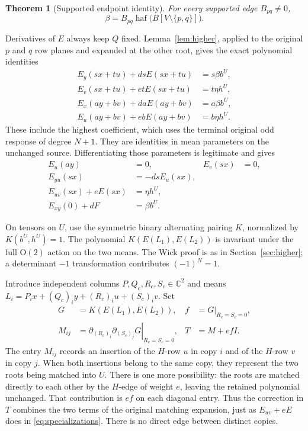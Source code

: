 \documentclass[11pt]{article}
\newtheorem{theorem}{Theorem}[section]
\theoremstyle{definition}
\theoremstyle{plain}
\numberwithin{equation}{section}
\begin{document}
\begin{theorem}[Supported endpoint identity]\label{thm:endpoint}
For every supported edge \(B_{pq}\ne0\),
\[
 \beta=B_{pq}\operatorname{haf}\bigl(B[V\setminus\{p,q\}]\bigr).
\]
\end{theorem}

Derivatives of \(E\) always keep \(Q\) fixed. Lemma~\ref{lem:higher}, applied
to the original \(p\) and \(q\) row planes and expanded at the other root,
gives the exact polynomial identities
\begin{equation}
 \begin{aligned}
 E_y(sx+tu)+dsE(sx+tu)&=s\beta b^U,\\
 E_v(sx+tu)+etE(sx+tu)&=t\eta h^U,\\
 E_x(ay+bv)+daE(ay+bv)&=a\beta b^U,\\
 E_u(ay+bv)+ebE(ay+bv)&=b\eta h^U.
 \end{aligned}
 \tag{7}\label{eq:boundary}
\end{equation}
These include the highest coefficient, which uses the terminal original odd
response of degree \(N+1\). They are identities in mean parameters on the
unchanged source. Differentiating those parameters is legitimate and gives
\begin{equation}
 \begin{aligned}
 E_u(ay)&=0,&E_v(sx)&=0,\\
 E_{yu}(sx)&=-dsE_u(sx),\\
 E_{uv}(sx)+eE(sx)&=\eta h^U,\\
 E_{xy}(0)+dF&=\beta b^U.
 \end{aligned}
 \tag{8}\label{eq:specializations}
\end{equation}

On tensors on \(U\), use the symmetric binary alternating pairing \(K\),
normalized by \(K(b^U,h^U)=1\). The polynomial
\(K(E(L_1),E(L_2))\) is invariant under the full \(\mathrm O(2)\) action
on the two means. The Wick proof is as in Section~\ref{sec:higher}; a
determinant \(-1\) transformation contributes \((-1)^N=1\).

Introduce independent columns \(P,Q_c,R_c,S_c\in\mathbb C^2\) and means
\(L_i=P_i x+(Q_c)_iy+(R_c)_iu+(S_c)_iv\). Set
\[
 \begin{aligned}
 G&=K(E(L_1),E(L_2)),& f&=G\big|_{R_c=S_c=0},\\
 M_{ij}&=\left.\partial_{(R_c)_i}\partial_{(S_c)_j}G\right|_{R_c=S_c=0},
 &T&=M+efI.
 \end{aligned}
\]
The entry \(M_{ij}\) records an insertion of the \(H\)-row \(u\) in
copy \(i\) and of the \(H\)-row \(v\) in copy \(j\). When both insertions
belong to the same copy, they represent the two roots being matched into
\(U\). There is one more possibility: the roots are matched directly to
each other by the \(H\)-edge of weight \(e\), leaving the retained
polynomial unchanged. That contribution is \(ef\) on each diagonal entry.
Thus the correction in \(T\) combines the two terms of the original
matching expansion, just as \(E_{uv}+eE\) does in
\eqref{eq:specializations}. There is no direct edge between distinct copies.
\end{document}
